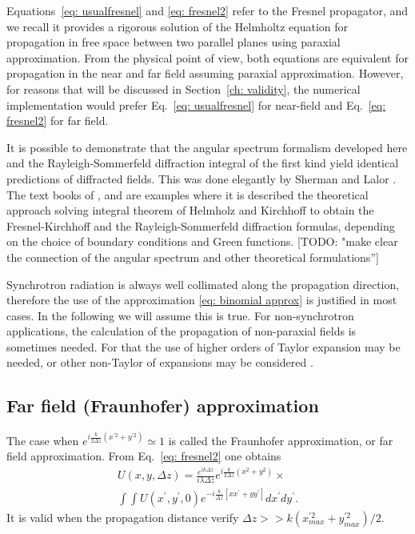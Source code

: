 \documentclass{iucr}              %
\newcommand{\todo}[1]{{\color{red}[TODO: "#1'']}}
\begin{document}
Equations~\ref{eq: usualfresnel} and \ref{eq: fresnel2} refer to the Fresnel propagator, and we recall it provides a rigorous solution of the Helmholtz equation for propagation in free space between two parallel planes using paraxial approximation. From the physical point of view, both equations are equivalent for propagation in the near and far field assuming paraxial approximation. However, for reasons that will be discussed in Section~\ref{ch: validity}, the numerical implementation would prefer Eq.~\ref{eq: usualfresnel} for near-field and Eq.~\ref{eq: fresnel2} for far field.

It is possible to demonstrate that the angular spectrum formalism developed here and the Rayleigh-Sommerfeld diffraction integral of the first kind yield identical predictions of diffracted fields. This was done elegantly by Sherman \cite{Sherman:67} and Lalor \cite{Lalor:68}. The text books of \cite{goodmanfourier}, \cite{nieto} and \cite{paganin_book} are examples where it is described the theoretical approach solving integral theorem of Helmholz and Kirchhoff to obtain the Fresnel-Kirchhoff and the Rayleigh-Sommerfeld diffraction formulas, depending on the choice of boundary conditions and Green functions. \todo{make clear the connection of the angular spectrum and other  theoretical formulations}

Synchrotron radiation is always well collimated along the propagation direction, therefore the use of the approximation \ref{eq: binomial approx} is justified in most cases. In the following we will assume this is true. For non-synchrotron applications, the calculation of the propagation of non-paraxial fields is sometimes needed. For that the use of higher orders of Taylor expansion may be needed, or other non-Taylor of expansions may be considered \cite{Mansuripur,Avoort}.


%
%

\subsection{Far field (Fraunhofer) approximation}


The case when $e^{i \frac{k}{2 \Delta z} (x^{\prime 2} + y^{\prime 2} )} \simeq 1$ is called the Fraunhofer approximation, or far field approximation. From Eq.~\ref{eq: fresnel2} one obtains 
\begin{multline}\label{eq: fraunhoffer}
U(x,y, \Delta z) = \frac {e^{ik\Delta z }}{ i \lambda \Delta z}  e^{ i \frac{k}{2 \Delta z} (x^2 + y^2) } \times \\
\int \int  U(x^\prime, y^\prime, 0)  e^{-i \frac{k}{\Delta z} [x  x^\prime + y y^\prime]} dx^\prime dy^\prime .
\end{multline}
It is valid when the propagation distance verify $\Delta z >>k (x^{\prime 2}_{max} + y^{\prime 2}_{max})/2 $.  
\end{document}
